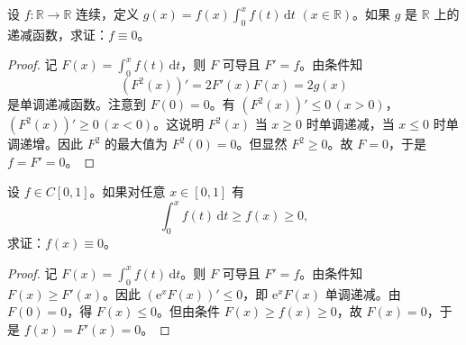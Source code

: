 \documentclass[../../main.tex]{subfiles}%
\begin{document}
\begin{example}
设 \( f : \mathbb{R} \to \mathbb{R} \) 连续，定义 \( g(x) = f(x)\int_{0}^{x} f(t) \, \mathrm{d}t \) \((x \in \mathbb{R})\)。如果 \( g \) 是 \( \mathbb{R} \) 上的递减函数，求证：\( f \equiv 0 \)。
\end{example}
\begin{proof}

记 \( F(x) = \int_{0}^{x} f(t) \, \mathrm{d}t \)，则 \( F \) 可导且 \( F' = f \)。由条件知
\[
(F^2(x))' = 2F'(x)F(x) = 2g(x)
\]
是单调递减函数。注意到 \( F(0) = 0 \)。有 \( (F^2(x))' \leqslant 0 \, (x > 0) \)，\( (F^2(x))' \geqslant 0 \, (x < 0) \)。这说明 \( F^2(x) \) 当 \( x \geqslant 0 \) 时单调递减，当 \( x \leqslant 0 \) 时单调递增。因此 \( F^2 \) 的最大值为 \( F^2(0) = 0 \)。但显然 \( F^2 \geqslant 0 \)。故 \( F = 0 \)，于是 \( f =F'= 0 \)。

\end{proof}

\begin{example}
设 \( f \in C[0,1] \)。如果对任意 \( x \in [0,1] \) 有
\[
\int_{0}^{x} f(t) \, \mathrm{d}t \geqslant f(x) \geqslant 0,
\]
求证：\( f(x) \equiv 0 \)。
\end{example}
\begin{proof}

记 \( F(x) = \int_{0}^{x} f(t) \, \mathrm{d}t \)。则 \( F \) 可导且 \( F' = f \)。由条件知 \( F(x) \geqslant F'(x) \)。因此 \( (\mathrm{e}^x F(x))' \leqslant 0 \)，即 \( \mathrm{e}^x F(x) \) 单调递减。由 \( F(0) = 0 \)，得 \( F(x) \leqslant 0 \)。但由条件 \( F(x) \geqslant f(x) \geqslant 0 \)，故 \( F(x) = 0 \)，于是 \( f(x) =F'(x)= 0 \)。

\end{proof}
\end{document}
